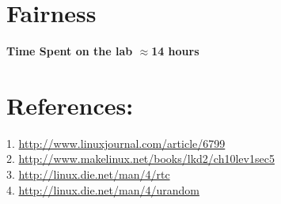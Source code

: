 \documentclass[10pt] {article}
\begin{document}
\section{Fairness}


\noindent \textbf{Time Spent on the lab \ensuremath{\approx}14 hours} 

\section{References:}
1. \url{http://www.linuxjournal.com/article/6799}  \\
2. \url{http://www.makelinux.net/books/lkd2/ch10lev1sec5} \\
3. \url{http://linux.die.net/man/4/rtc} \\
4. \url{http://linux.die.net/man/4/urandom}
\end{document}
